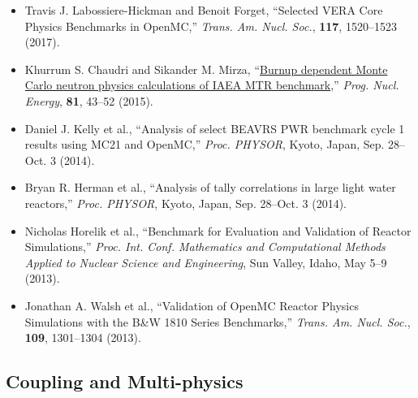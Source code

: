 \begin{itemize}
\item Travis J. Labossiere-Hickman and Benoit Forget, ``Selected VERA Core Physics
Benchmarks in OpenMC,'' \textit{Trans. Am. Nucl. Soc.}, \textbf{117}, 1520--1523 (2017).

\item Khurrum S. Chaudri and Sikander M. Mirza, ``\href{https://doi.org/10.1016/j.pnucene.2014.12.018}{Burnup dependent Monte Carlo neutron physics calculations of IAEA MTR benchmark},''
\textit{Prog. Nucl. Energy}, \textbf{81}, 43--52 (2015).

\item Daniel J. Kelly et al., ``Analysis of select BEAVRS PWR benchmark cycle 1 results using MC21 and OpenMC,'' \textit{Proc. PHYSOR}, Kyoto, Japan, Sep. 28--Oct. 3 (2014).

\item Bryan R. Herman et al., ``Analysis of tally correlations in large light water reactors,'' \textit{Proc. PHYSOR}, Kyoto, Japan, Sep. 28--Oct. 3 (2014).

\item Nicholas Horelik et al., ``Benchmark for Evaluation and Validation of Reactor Simulations,'' \textit{Proc. Int. Conf. Mathematics and Computational Methods Applied to Nuclear Science and Engineering}, Sun Valley, Idaho, May 5--9 (2013).

\item Jonathan A. Walsh et al., ``Validation of OpenMC Reactor Physics Simulations with the B\&W 1810 Series Benchmarks,'' \textit{Trans. Am. Nucl. Soc.}, \textbf{109}, 1301--1304 (2013).
\end{itemize}

\subsection{Coupling and Multi-physics}

